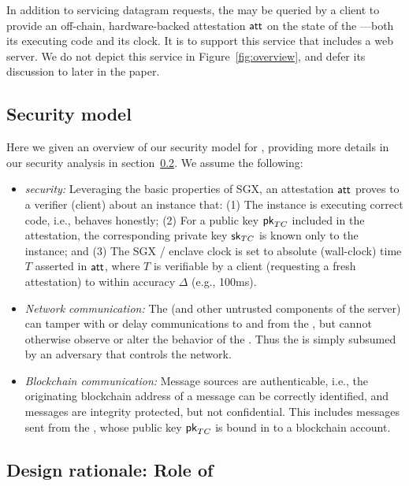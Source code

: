 In addition to servicing datagram requests, the \encname may be queried by a client to provide an off-chain, hardware-backed attestation ${\sf att}$ on the state of the \encname---both its executing code and its clock. It is to support this service that \medname includes a web server. We do not depict this service in Figure~\ref{fig:overview}, and defer its discussion to later in the paper.




\subsection{Security model}

Here we given an overview of our security model for \tc, providing more details in our security analysis in section~\ref{}. We assume the following:

\begin{itemize}
\item {\em \encname security:} Leveraging the basic properties of SGX, an attestation ${\sf att}$ proves to a verifier (client) about an \encname instance that: (1) The instance is executing correct code, i.e., behaves honestly; (2) For a public key ${\sf pk}_{TC}$ included in the attestation, the corresponding private key ${{\sf sk}_{TC}}$ is known only to the instance; and (3) The SGX / enclave clock is set to absolute (wall-clock) time $T$ asserted in ${\sf att}$, where $T$ is verifiable by a client (requesting a fresh attestation) to within accuracy $\Delta$ (e.g., 100ms).

\item {\em Network communication:} The \medname (and other untrusted components of the \tc server) can tamper with or delay communications to and from the \encname, but cannot otherwise observe or alter the behavior of the \encname. Thus the \medname is simply subsumed by an adversary that controls the network. 

\item {\em Blockchain communication:} Message sources are authenticable, i.e., the originating blockchain address of a message can be correctly identified, and messages are integrity protected, but not confidential. This includes messages sent from the \encname, whose public key ${\sf pk}_{TC}$ is bound in \tc to a blockchain account. 
\end{itemize}

\subsection{Design rationale: Role of \tcont}

